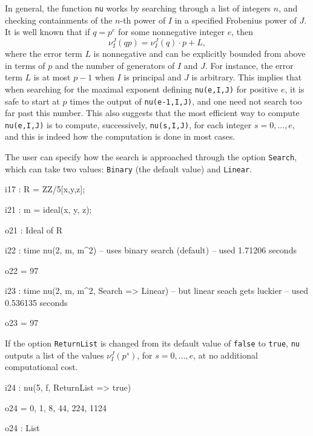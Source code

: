\documentclass{amsart}
\begin{document}
In general, the function \texttt{nu} works by searching through a list of integers $n$, and checking containments of the $n$-th power of $I$ in a specified Frobenius power of $J$.
It is well known that if $q=p^e$ for some nonnegative integer $e$, then \[ \nu_I^J(qp) = \nu_I^J(q)\cdot p + L,\]  where the error term $L$ is nonnegative and can be explicitly bounded from above in terms of $p$ and the number of generators of $I$ and $J$.
For instance, the error term $L$ is at most $p-1$ when $I$ is principal and $J$ is arbitrary.
This implies that when searching for the maximal exponent defining \texttt{nu(e,I,J)} for positive $e$, it is safe to start at $p$ times the output of \texttt{nu(e-1,I,J)}, and one need not search too far past this number.
This also suggests that the most efficient way to compute \texttt{nu(e,I,J)} is to compute, successively, \texttt{nu(s,I,J)}, for each integer $s = 0,\ldots,e$, and this is indeed how the computation is done in most cases.

The user can specify how the search is approached through the option \texttt{Search}, which can take two values: 
 \texttt{Binary} (the default value) and  \texttt{Linear}.

\medskip
{\small
{}
\begin{MyVerbatim}
i17 : R = ZZ/5[x,y,z];

i21 : m = ideal(x, y, z);

o21 : Ideal of R

i22 : time nu(2, m, m^2) -- uses binary search (default)
     -- used 1.71206 seconds

o22 = 97

i23 : time nu(2, m, m^2, Search => Linear) -- but linear seach gets luckier
     -- used 0.536135 seconds

o23 = 97
\end{MyVerbatim}
}
\medskip


If the option \texttt{ReturnList} is changed from its default value of \texttt{false} to \texttt{true},
\texttt{nu} outputs a list of the values $\nu_I^J(p^s)$, for $s=0,\ldots,e$, at no additional computational cost.

\medskip
{\small
{}
\begin{MyVerbatim}
i24 : nu(5, f, ReturnList => true)

o24 = {0, 1, 8, 44, 224, 1124}

o24 : List
\end{MyVerbatim}
}
\medskip
\end{document}

